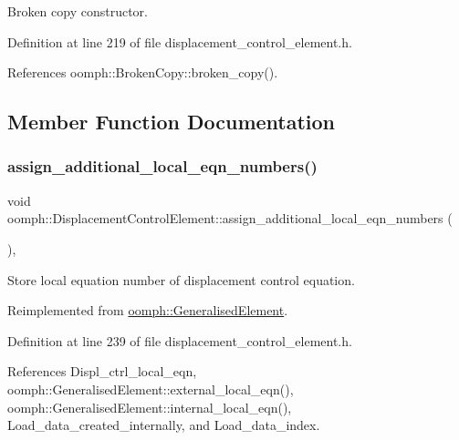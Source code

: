 Broken copy constructor. 



Definition at line 219 of file displacement\+\_\+control\+\_\+element.\+h.



References oomph\+::\+Broken\+Copy\+::broken\+\_\+copy().



\subsection{Member Function Documentation}
\mbox{\label{classoomph_1_1DisplacementControlElement_a7911067dbe7a9dcfa3e981c9b6775c54}} 
\subsubsection{\texorpdfstring{assign\+\_\+additional\+\_\+local\+\_\+eqn\+\_\+numbers()}{assign\_additional\_local\_eqn\_numbers()}}
{\footnotesize\ttfamily void oomph\+::\+Displacement\+Control\+Element\+::assign\+\_\+additional\+\_\+local\+\_\+eqn\+\_\+numbers (\begin{DoxyParamCaption}{ }\end{DoxyParamCaption})\hspace{0.3cm}{\ttfamily [inline]}, {\ttfamily [virtual]}}



Store local equation number of displacement control equation. 



Reimplemented from \hyperlink{classoomph_1_1GeneralisedElement_a4cdd0d1eef33b43f652c8f0b9e43967b}{oomph\+::\+Generalised\+Element}.



Definition at line 239 of file displacement\+\_\+control\+\_\+element.\+h.



References Displ\+\_\+ctrl\+\_\+local\+\_\+eqn, oomph\+::\+Generalised\+Element\+::external\+\_\+local\+\_\+eqn(), oomph\+::\+Generalised\+Element\+::internal\+\_\+local\+\_\+eqn(), Load\+\_\+data\+\_\+created\+\_\+internally, and Load\+\_\+data\+\_\+index.

